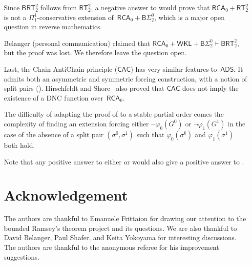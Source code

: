\documentclass{article}
\newcommand{\BSig}{\mathsf{B}\Sigma^0}
\newcommand{\RCA}[0]{\mathsf{RCA}}
\newcommand{\WKL}[0]{\mathsf{WKL}}
\newcommand{\CAC}[0]{\mathsf{CAC}}
\newcommand{\ADS}[0]{\mathsf{ADS}}
\newcommand{\RT}[0]{\mathsf{RT}}
\newcommand{\BRT}[0]{\mathsf{BRT}}
\numberwithin{theorem}{section}
\newtheorem{question}[theorem]{Question}
\begin{document}

Since $\BRT^2_2$ follows from $\RT^2_2$, a negative answer to  would prove that $\RCA_0 + \RT^2_2$ is not a $\Pi^1_1$-conservative extension of~$\RCA_0 + \BSig_2$, which is a major open question in reverse mathematics.

Belanger (personal communication) claimed that $\RCA_0 + \WKL + \BSig_2 \vdash \BRT^2_2$, but the proof was lost. We therefore leave the question open. 



Last, the Chain AntiChain principle ($\CAC$) has very similar features to~$\ADS$. It admits both an asymmetric and symmetric forcing construction, with a notion of split pairs (\cite[Theorem 14]{patey_partial_2018}). Hirschfeldt and Shore~\cite[Corollary 3.11]{hirschfeldt_combinatorial_2007} also proved that $\CAC$ does not imply the existence of a DNC function over~$\RCA_0$.


The difficulty of adapting the proof of  to a stable partial order comes the complexity of finding an extension forcing either $\neg \varphi_0(G^0)$ or $\neg \varphi_1(G^1)$ in the case of the absence of a split pair $(\sigma^0, \sigma^1)$ such that $\varphi_0(\sigma^0)$ and $\varphi_1(\sigma^1)$ both hold.

Note that any positive answer to either  or  would also give a positive answer to .

\section*{Acknowledgement}

The authors are thankful to Emanuele Frittaion for drawing our attention to the bounded Ramsey's theorem project and its questions. We are also thankful to David Belanger, Paul Shafer, and Keita Yokoyama for interesting discussions.
The authors are thankful to the anonymous referee for his improvement suggestions.




\end{document}

